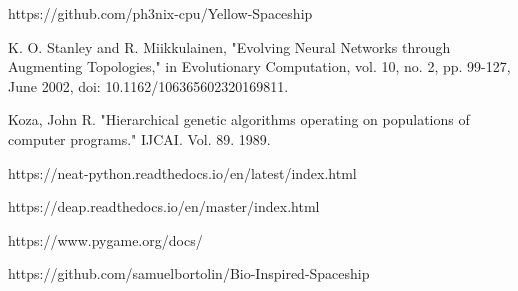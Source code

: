 \documentclass[journal]{IEEEtran}
\begin{document}


%
\IEEEpeerreviewmaketitle










\ifCLASSOPTIONcaptionsoff
  \newpage
\fi


%
%
%
\begin{thebibliography}{1}

https://github.com/ph3nix-cpu/Yellow-Spaceship

K. O. Stanley and R. Miikkulainen, "Evolving Neural Networks through Augmenting Topologies," in Evolutionary Computation, vol. 10, no. 2, pp. 99-127, June 2002, doi: 10.1162/106365602320169811.

Koza, John R. "Hierarchical genetic algorithms operating on populations of computer programs." IJCAI. Vol. 89. 1989.

https://neat-python.readthedocs.io/en/latest/index.html

https://deap.readthedocs.io/en/master/index.html

https://www.pygame.org/docs/

https://github.com/samuelbortolin/Bio-Inspired-Spaceship

\end{thebibliography}
\end{document}
